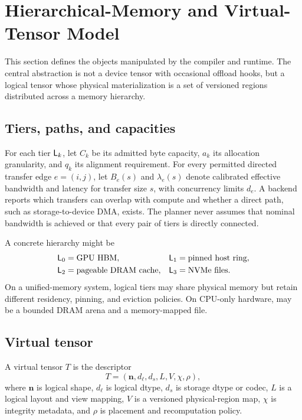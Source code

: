\section{Hierarchical-Memory and Virtual-Tensor Model}
\label{sec:model}

This section defines the objects manipulated by the compiler and runtime. The central abstraction is not a device tensor with occasional offload hooks, but a logical tensor whose physical materialization is a set of versioned regions distributed across a memory hierarchy.

\subsection{Tiers, paths, and capacities}

For each tier $\mathsf{L}_{k}$, let $C_k$ be its admitted byte capacity, $a_k$ its allocation granularity, and $q_k$ its alignment requirement. For every permitted directed transfer edge $e=(i,j)$, let $B_e(s)$ and $\lambda_e(s)$ denote calibrated effective bandwidth and latency for transfer size $s$, with concurrency limits $d_e$. A backend reports which transfers can overlap with compute and whether a direct path, such as storage-to-device DMA, exists. The planner never assumes that nominal bandwidth is achieved or that every pair of tiers is directly connected.

A concrete hierarchy might be
\[
\begin{aligned}
  \mathsf{L}_{0}&=\text{GPU HBM}, &
  \mathsf{L}_{1}&=\text{pinned host ring},\\
  \mathsf{L}_{2}&=\text{pageable DRAM cache}, &
  \mathsf{L}_{3}&=\text{NVMe files}.
\end{aligned}
\]
On a unified-memory system, logical tiers may share physical memory but retain different residency, pinning, and eviction policies. On CPU-only hardware,  may be a bounded DRAM arena and  a memory-mapped file.

\subsection{Virtual tensor}

\begin{definition}
A virtual tensor $T$ is the descriptor
\[
T=(\mathbf n,d_{\ell},d_s,L,V,\chi,\rho),
\]
where $\mathbf n$ is logical shape, $d_{\ell}$ is logical dtype, $d_s$ is storage dtype or codec, $L$ is a logical layout and view mapping, $V$ is a versioned physical-region map, $\chi$ is integrity metadata, and $\rho$ is placement and recomputation policy.
\end{definition}

